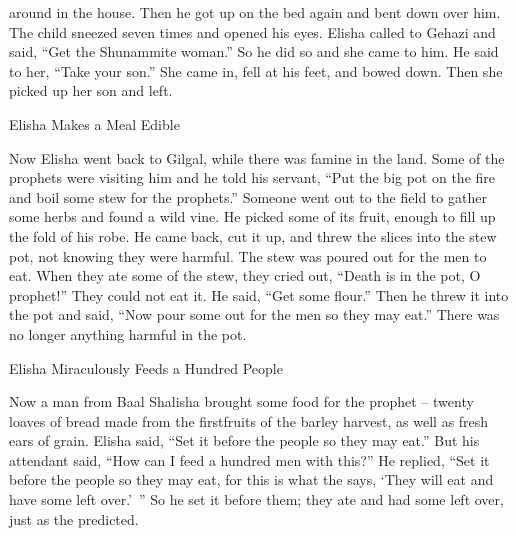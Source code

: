 {around
in the house.
Then he got up
on the bed again and bent down
over
him. The child
sneezed
seven
times
and opened
his eyes.
Elisha called
to
Gehazi
and said,
“Get the Shunammite
woman.” So he did so and she came
to him.
He said
to her, “Take
your son.”
She came
in, fell
at his feet,
and bowed
down. Then she picked
up her son
and left.
\par }{\SH Elisha Makes a Meal Edible
\par }{\PP {}Now Elisha
went back
to Gilgal,
while there was famine
in the land.
Some of the prophets
were visiting
him and he told
his servant,
“Put
the big
pot
on
the fire and boil
some stew
for the prophets.”
Someone
went out
to
the field
to gather
some herbs
and found
a wild
vine.
He picked
some
of its fruit,
enough to fill
up the fold of his robe.
He came back,
cut it up,
and threw the slices into
the stew
pot,
not
knowing they were harmful.
The stew was poured
out for the men
to eat.
When
they ate
some of the stew,
they
cried out,
“Death
is in the pot,
O
prophet!” They could
not
eat it.
He said,
“Get
some flour.”
Then he threw
it into
the pot
and said,
“Now pour
some out for the men
so they may eat.”
There was
no
longer anything
harmful
in the pot.
\par }{\SH Elisha Miraculously Feeds a Hundred People
\par }{\PP {}Now a man
from Baal Shalisha
brought
some food
for the prophet –
twenty
loaves of bread
made from the firstfruits
of the barley
harvest, as well as fresh ears of grain.
Elisha said,
“Set it before
the people
so they may eat.”
But his attendant
said,
“How
can I
feed a hundred
men
with this?” He replied,
“Set it before
the people
so they may eat,
for
this is what
the {}
says,
‘They will eat
and have some left over.’ ”
So
he set
it before
them; they ate
and had some left
over, just
as the
{} predicted.

}
